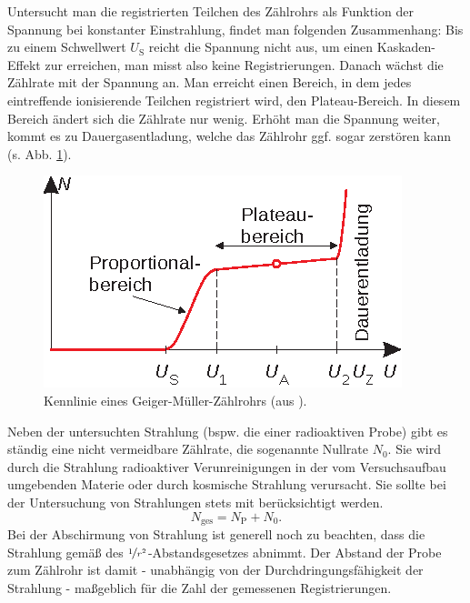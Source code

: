 Untersucht man die registrierten Teilchen des Zählrohrs als Funktion der Spannung bei konstanter Einstrahlung, findet man folgenden Zusammenhang: Bis zu einem Schwellwert $U_\mathrm S$ reicht die Spannung nicht aus, um einen Kaskaden-Effekt zur erreichen, man misst also keine Registrierungen. Danach wächst die Zählrate mit der Spannung an. Man erreicht einen Bereich, in dem jedes eintreffende ionisierende Teilchen registriert wird, den Plateau-Bereich. In diesem Bereich ändert sich die Zählrate nur wenig. Erhöht man die Spannung weiter, kommt es zu Dauergasentladung, welche das Zählrohr ggf. sogar zerstören kann (s. Abb. \ref{fig:i_04_kennlinie}).

\begin{figure}[tb]
\centering
\includegraphics[]{fig/i_04_kennlinie.eps}
\caption{Kennlinie eines Geiger-Müller-Zählrohrs (aus \cite[S. 515]{EKS07}).}
\label{fig:i_04_kennlinie}
\end{figure}

Neben der untersuchten Strahlung (bspw. die einer radioaktiven Probe) gibt es ständig eine nicht vermeidbare Zählrate, die sogenannte Nullrate $N_0$. Sie wird durch die Strahlung radioaktiver Verunreinigungen in der vom Versuchsaufbau umgebenden Materie oder durch kosmische Strahlung verursacht. Sie sollte bei der Untersuchung von Strahlungen stets mit berücksichtigt werden.
\begin{equation}
N_{\mathrm{ges}} = N_\mathrm{P} + N_0.
\end{equation}
Bei der Abschirmung von Strahlung ist generell noch zu beachten, dass die Strahlung gemäß des $\nicefrac{1}{r^2}$-Abstandsgesetzes abnimmt. Der Abstand der Probe zum Zählrohr ist damit - unabhängig von der Durchdringungsfähigkeit der Strahlung - maßgeblich für die Zahl der gemessenen Registrierungen. \cite{EKS07}